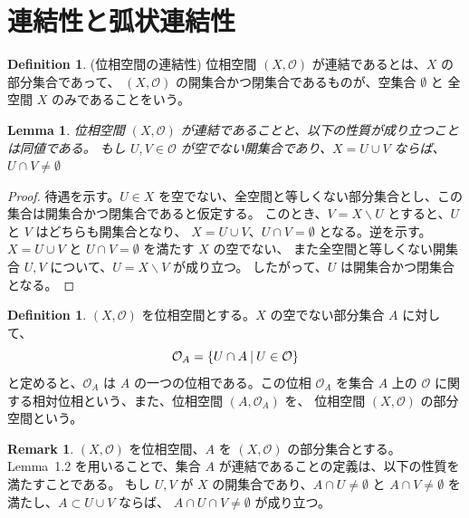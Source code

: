 \documentclass[11pt,a4paper]{jsarticle}
\newtheorem{lem}[thm]{Lemma}
\theoremstyle{definition}
\newtheorem{dfn}[thm]{Definition}
\newtheorem{rem}[thm]{Remark}
\begin{document}
%
%
\section{連結性と弧状連結性}

\begin{dfn}{(位相空間の連結性)}
  位相空間 $(X, \mathcal{O})$ が連結であるとは、$X$ の部分集合であって、
  $(X, \mathcal{O})$ の開集合かつ閉集合であるものが、空集合 $\emptyset$ と
  全空間 $X$ のみであることをいう。
\end{dfn}

\begin{lem}
  位相空間 $(X, \mathcal{O})$ が連結であることと、以下の性質が成り立つことは同値である。
  もし $U, V \in \mathcal{O}$ が空でない開集合であり、$X = U \cup V$ ならば、 
  $U \cap V \ne \emptyset$
\end{lem}

\begin{proof}
  待遇を示す。$U \in X$ を空でない、全空間と等しくない部分集合とし、この集合は開集合かつ閉集合であると仮定する。
  このとき、$ V = X \backslash U$ とすると、$U$ と $V$ はどちらも開集合となり、
  $X = U \cup V$、$U \cap V = \emptyset$ となる。逆を示す。
  $X = U \cup V$ と $U \cap V = \emptyset$ を満たす $X$ の空でない、
  また全空間と等しくない開集合 $U, V$ について、$U = X \backslash V$ が成り立つ。
  したがって、$U$ は開集合かつ閉集合となる。
\end{proof}

\begin{dfn}
  $(X, \mathcal{O})$ を位相空間とする。$X$ の空でない部分集合 $A$ に対して、
  \begin{equation}
    \mathcal{O}_{A} = \{ U \cap A \:|\: U \in \mathcal{O} \} \notag
  \end{equation}
  と定めると、$\mathcal{O}_{A}$ は $A$ の一つの位相である。この位相 $\mathcal{O}_{A}$ を集合 $A$
  上の $\mathcal{O}$ に関する相対位相という、また、位相空間 $(A, \mathcal{O}_{A})$ を、
  位相空間 $(X, \mathcal{O})$ の部分空間という。
\end{dfn}

\begin{rem}
  $(X, \mathcal{O})$ を位相空間、$A$ を $(X, \mathcal{O})$ の部分集合とする。
  Lemma~1.2 を用いることで、集合 $A$ が連結であることの定義は、以下の性質を満たすことである。
  もし $U, V $ が $X$ の開集合であり、$A \cap U \ne \emptyset$ と
  $A \cap V \ne \emptyset$ を満たし、$A \subset U \cup V$ ならば、
  $A \cap U \cap V \ne \emptyset$ が成り立つ。
\end{rem}
\end{document}
